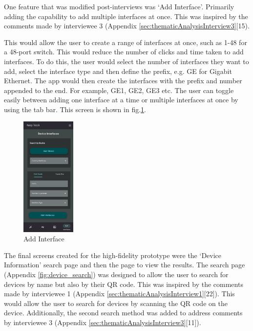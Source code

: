 \documentclass [11pt,a4paper]{article}
\begin{document}
One feature that was modified post-interviews was `Add Interface'. Primarily adding the capability to add multiple interfaces at once. This was inspired by the comments made by interviewee 3 (Appendix \ref{sec:thematicAnalysisInterview3}[15). 

\pagebreak
This would allow the user to create a range of interfaces at once, such as 1-48 for a 48-port switch. This would reduce the number of clicks and time taken to add interfaces. To do this, the user would select the number of interfaces they want to add, select the interface type and then define the prefix, e.g. GE for Gigabit Ethernet. The app would then create the interfaces with the prefix and number appended to the end. For example, GE1, GE2, GE3 etc. The user can toggle easily between adding one interface at a time or multiple interfaces at once by using the tab bar. This screen is shown in fig.\ref{fig:interface_add}.

\begin{figure}
    \centering
    \includegraphics[width=0.24\textwidth]{images/interface_add.png}
    \caption{Add Interface}
    \label{fig:interface_add}
\end{figure}

The final screens created for the high-fidelity prototype were the `Device Information' search page and then the page to view the results. The search page (Appendix \ref{fig:device_search}) was designed to allow the user to search for devices by name but also by their QR code. This was inspired by the comments made by interviewee 1 (Appendix \ref{sec:thematicAnalysisInterview1}[22]). This would allow the user to search for devices by scanning the QR code on the device. Additionally, the second search method was added to address comments by interviewee 3 (Appendix \ref{sec:thematicAnalysisInterview3}[11]). 
\end{document}

